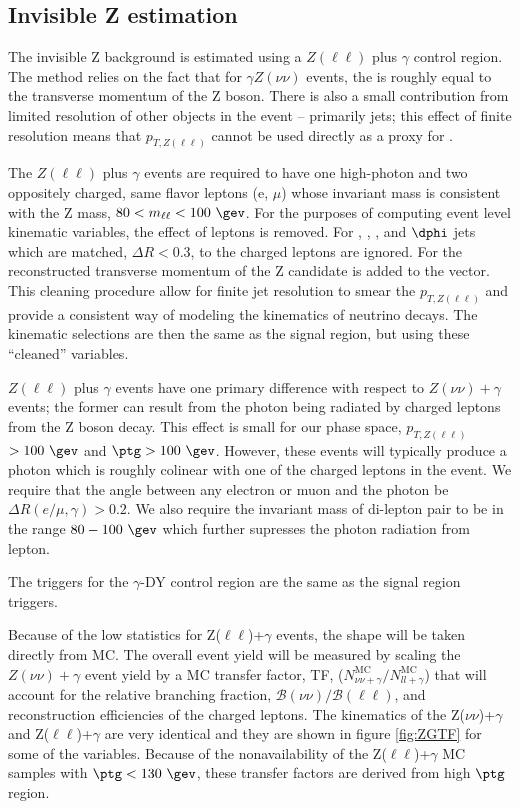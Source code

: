 \subsection{Invisible Z estimation}
\label{subsec:zinv}
The invisible Z background is estimated using a $Z(\ell\ell)$ plus $\gamma$ control region.
The method relies on the fact that for $\gamma Z(\nu\nu)$ events, the \ptmiss is
roughly equal to the transverse momentum of the Z boson.  There is also a small
contribution from limited resolution
of other objects in the event -- primarily jets; this effect of finite resolution
means that $p_{T,Z(\ell\ell)}$ cannot be used directly as a proxy for \ptmiss.   

The $Z(\ell\ell)$ plus $\gamma$ events are required to have one high-\pt photon and two oppositely 
charged, same flavor leptons (e, $\mu$) whose invariant mass is consistent with 
the Z mass, $80<m_{\ell\ell}<100~\gev$.  For the purposes of computing event level
kinematic variables, the effect of leptons is removed.  For \ST, \nj, \nb, and $\dphi$
jets which are matched, $\Delta R<0.3$, to the charged leptons are ignored.  For \ptmiss
the reconstructed transverse momentum of the Z candidate is added to the \ptmiss vector.
This cleaning procedure allow for finite jet resolution to smear the $p_{T,Z(\ell\ell)}$
and provide a consistent way of modeling the kinematics of neutrino decays.  The kinematic 
selections are then the same as the signal region, but using these ``cleaned'' variables.  

$Z(\ell\ell)$ plus $\gamma$ events have one primary difference with respect to $Z(\nu\nu)+\gamma$
events;  the former can result from the photon being radiated by charged leptons from the
Z boson decay.  This effect is small for our phase space, $p_{T,Z(\ell\ell)}$~\ptmiss$>100~\gev$ and 
$\ptg>100~\gev$.  However, these events will typically produce a photon which is
roughly colinear with one of the charged leptons in the event.  We require that the angle 
between any electron or muon and the photon be $\Delta R(e/\mu,\gamma)>0.2$. We also 
require the invariant mass of di-lepton pair to be in the range $80-100\ \gev$ which further supresses 
the photon radiation from lepton.

The triggers for the $\gamma$-DY control region are the same as the signal region
triggers.

Because of the low statistics for Z($\ell\ell$)+$\gamma$ events, the \ptmiss shape will be taken directly from MC.  
The overall event yield will be measured by scaling the $Z(\nu\nu)+\gamma$ event yield
by a MC transfer factor, TF, ($N^{\text{MC}}_{\nu\nu+\gamma}/N_{ll+\gamma}^{\text{MC}}$) that will account for the relative branching fraction, $\mathcal{B}(\nu\nu)/\mathcal{B}(\ell\ell)$,
and reconstruction efficiencies of the charged leptons. The kinematics of the Z($\nu\nu$)+$\gamma$ and Z($\ell\ell$)+$\gamma$ are very identical
and they are shown in figure \ref{fig:ZGTF} for some of the variables. 
Because of the nonavailability of the Z($\ell\ell$)+$\gamma$ MC 
samples with $\ptg<130~\gev$, these transfer factors are derived from high $\ptg$ region.

